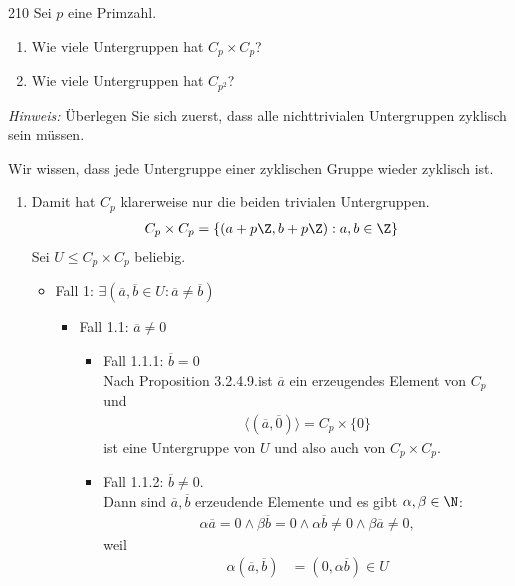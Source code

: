 \begin{algebraUE}{210}
Sei $p$ eine Primzahl.
\begin{enumerate}
  \item Wie viele Untergruppen hat $C_p \times C_p$?
  \item Wie viele Untergruppen hat $C_{p^2}$?
\end{enumerate}
\textit{Hinweis:} Überlegen Sie sich zuerst, dass alle nichttrivialen Untergruppen
zyklisch sein müssen.
\end{algebraUE}
\begin{solution}
Wir wissen, dass jede Untergruppe einer zyklischen Gruppe wieder zyklisch ist.
\begin{enumerate}
  \item Damit hat $C_p$ klarerweise nur die beiden trivialen Untergruppen.
  \begin{align*}
    C_p \times C_p = \{(a + p\Z, b + p\Z): a,b \in \Z\}
  \end{align*}
  Sei $U \leq C_p \times C_p$ beliebig.
  \begin{itemize}
    \item Fall 1: $\exists (\overline{a},\overline{b} \in U: \overline{a} \neq \overline{b})$
    \begin{itemize}
      \item Fall 1.1: $\overline{a} \neq 0$
      \begin{itemize}
        \item Fall 1.1.1: $\overline{b} = 0$ \\
        Nach Proposition 3.2.4.9.ist $\overline{a}$ ein erzeugendes Element von $C_p$ und
        \begin{align*}
          \langle (\overline{a}, \overline{0})\rangle  = C_p \times \{0\}
        \end{align*}
        ist eine Untergruppe von $U$ und also auch von $C_p \times C_p$.
        \item Fall 1.1.2: $\overline{b} \neq 0$. \\
        Dann sind $\overline{a},\overline{b}$ erzeudende Elemente und es gibt $\alpha, \beta \in \N$:
        \begin{align*}
          \alpha \overline{a} = 0 \land \beta \overline{b} = 0
          \land \alpha \overline{b} \neq 0 \land \beta \overline{a} \neq 0,
        \end{align*}
        weil
        \begin{align*}
          \alpha (\overline{a},\overline{b}) &= (0,\alpha \overline{b}) \in U \\

\end{align*}
\end{itemize}
\end{itemize}
\end{itemize}
\end{enumerate}
\end{solution}
